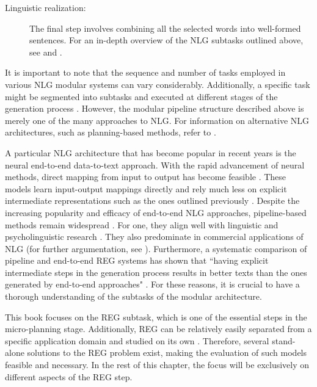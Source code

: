 \begin{description}
\item[Linguistic realization:] The final step involves combining all the selected words into well-formed sentences. For an in-depth overview of the NLG subtasks outlined above, see \citet{reiter2000building} and \citet{gatt2018survey}. 
\end{description}

It is important to note that the sequence and number of tasks employed in various NLG modular systems can vary considerably. Additionally, a specific task might be segmented into subtasks and executed at different stages of the generation process \citep{mellish_scott_cahill_paiva_evans_reape_2006}. However, the modular pipeline structure described above is merely one of the many approaches to NLG. For information on alternative NLG architectures, such as planning-based methods, refer to \citet{gatt2018survey}. 

A particular NLG architecture that has become popular in recent years is the neural end-to-end data-to-text approach. With the rapid advancement of neural methods, direct mapping from input to output has become feasible \citep{Goodfellow2016,Goldberg2017}. These models learn input-output mappings directly and rely much less on explicit intermediate representations such as the ones outlined previously \citep{castro-ferreira-etal-2019-neural}. Despite the increasing popularity and efficacy of end-to-end NLG approaches, pipeline-based methods remain widespread \citep{gatt2018survey}. For one, they align well with linguistic and psycholinguistic research \citep{Gompel2019}. They also predominate in commercial applications of NLG (for further argumentation, see \cite{reiter2016method,reiter-2017-commercial}). Furthermore, a systematic comparison of pipeline and end-to-end REG systems has shown that ``having explicit intermediate steps in the generation process results in better texts than the ones generated by end-to-end approaches" \citet[552]{castro-ferreira-etal-2019-neural}. For these reasons, it is crucial to have a thorough understanding of the subtasks of the modular architecture. 

This book focuses on the REG subtask, which is one of the essential steps in the micro-planning stage. Additionally, REG can be relatively easily separated from a specific application domain and studied on its own \citep{gatt2018survey}. Therefore, several stand-alone solutions to the REG problem exist, making the evaluation of such models feasible and necessary. In the rest of this chapter, the focus will be exclusively on different aspects of the REG step. 


